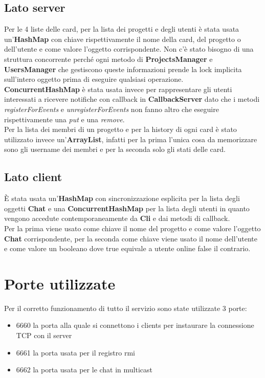\documentclass[11pt]{report}
\begin{document}
	\subsection{Lato server}
	Per le 4 liste delle card, per la lista dei progetti e degli utenti è stata usata un'\textbf{HashMap} con chiave rispettivamente il nome della card, del progetto o dell'utente e come valore l'oggetto corrispondente. Non c'è stato bisogno di una struttura concorrente perché ogni metodo di \textbf{ProjectsManager} e \textbf{UsersManager} che gestiscono queste informazioni prende la lock implicita sull'intero oggetto prima di eseguire qualsiasi operazione.\\
	\textbf{ConcurrentHashMap} è stata usata invece per rappresentare gli utenti interessati a ricevere notifiche con callback in \textbf{CallbackServer} dato che i metodi \textit{registerForEvents} e \textit{unregisterForEvents} non fanno altro che eseguire rispettivamente una \textit{put} e una \textit{remove}.\\
	Per la lista dei membri di un progetto e per la history di ogni card è stato utilizzato invece un'\textbf{ArrayList}, infatti per la prima l'unica cosa da memorizzare sono gli username dei membri e per la seconda solo gli stati delle card.
	
	\subsection{Lato client}
	È stata usata un'\textbf{HashMap} con sincronizzazione esplicita per la lista degli oggetti \textbf{Chat} e una \textbf{ConcurrentHashMap} per la lista degli utenti in quanto vengono accedute contemporaneamente da \textbf{Cli} e dai metodi di callback.\\
	Per la prima viene usato come chiave il nome del progetto e come valore l'oggetto \textbf{Chat} corrispondente, per la seconda come chiave viene usato il nome dell'utente e come valore un booleano dove true equivale a utente online false il contrario.
	
	\section{Porte utilizzate}
	Per il corretto funzionamento di tutto il servizio sono state utilizzate 3 porte:
	\begin{itemize}
		\item 6660 la porta alla quale si connettono i clients per instaurare la connessione TCP con il server
		\item 6661 la porta usata per il registro rmi
		\item 6662 la porta usata per le chat in multicast
	\end{itemize}
	
\end{document}

